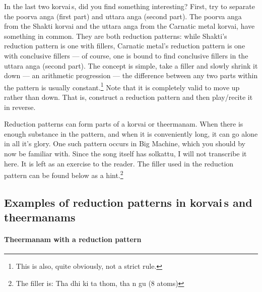 In the last two korvai\,s, did you find something interesting? First, try to separate
the poorva anga (first part) and uttara anga (second part). The poorva anga from the
Shakti korvai and the uttara anga from the Carnatic metal korvai, have something in
common. They are both reduction patterns: while Shakti's reduction pattern is one with
fillers, Carnatic metal's reduction pattern is one with conclusive fillers --- of
course, one is bound to find conclusive fillers in the uttara anga (second part). The
concept is simple, take a filler and slowly shrink it down --- an arithmetic
progression --- the difference between any two parts within the pattern is usually
constant.\footnote{This is also, quite obviously, not a strict rule.} Note that it is
completely valid to move up rather than down. That is, construct a reduction pattern
and then play/recite it in reverse.

Reduction patterns can form parts of a korvai or theermanam. When there is enough
substance in the pattern, and when it is conveniently long, it can go alone in all
it's glory. One such pattern occurs in Big Machine, which you should by now be familiar
with. Since the song itself has solkattu, I will not transcribe it here. It is left as
an exercise to the reader. The filler used in the reduction pattern can be found below
as a hint.\footnote{The filler is: Tha dhi ki ta thom, tha n gu (8 atoms)}

\subsection{Examples of reduction patterns in korvai\,s and theermanams}

\paragraph{Theermanam with a reduction pattern}

